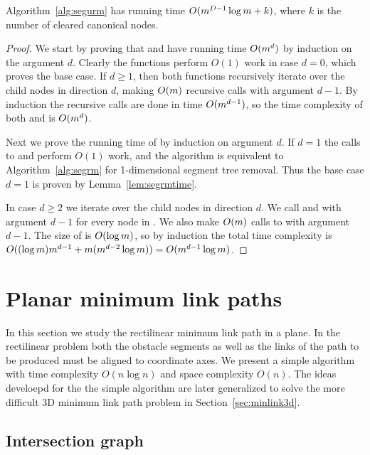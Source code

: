 \documentclass[english,gradu]{tktltiki2018}
\begin{document}
\begin{lem}\label{lem:segurmtime}Algorithm~\ref{alg:segurm} has running time $O(m^{D-1}\log m + k)$, where $k$ is the number of cleared canonical nodes.\end{lem}
\begin{proof}
We start by proving that \pdst and \recomp have running time $O(m^d)$ by induction on the argument $d$.
Clearly the functions perform $O(1)$ work in case $d=0$, which proves the base case.
If $d\ge 1$, then both functions recursively iterate over the child nodes in direction $d$, making $O(m)$ recursive calls with argument $d-1$.
By induction the recursive calls are done in time $O(m^{d-1})$, so the time complexity of both \pdst and \recomp is $O(m^d)$.

Next we prove the running time of \cleardt by induction on argument $d$.
If $d=1$ the calls to \pdst and \recomp perform $O(1)$ work, and the algorithm is equivalent to Algorithm~\ref{alg:segrm} for 1-dimensional segment tree removal.
Thus the base case $d=1$ is proven by Lemma~\ref{lem:segrmtime}.

In case $d\ge 2$ we iterate over the child nodes in direction $d$.
We call \pdst and \recomp with argument $d-1$ for every node in .
We also make $O(m)$ calls to \cleardt with argument $d-1$.
The size of  is $O(\log m)$, so by induction the total time complexity is $O((\log m)m^{d-1} + m(m^{d-2}\log m))=O(m^{d-1}\log m)$.

\end{proof}



\section{Planar minimum link paths}\label{sec:minlink2d}

In this section we study the rectilinear minimum link path in a plane.
In the rectilinear problem both the obstacle segments as well as the links of the path to be produced must be aligned to coordinate axes.
We present a simple algorithm with time complexity $O(n\log n)$ and space complexity $O(n)$.
The ideas develoepd for the the simple algorithm are later generalized to solve the more difficult 3D minimum link path problem in Section~\ref{sec:minlink3d}.

\subsection{Intersection graph}
\end{document}
